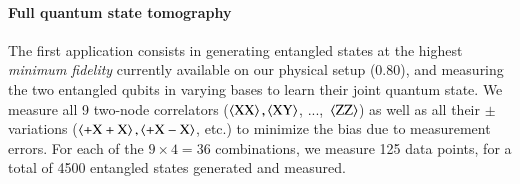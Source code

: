 
\paragraph{Full quantum state tomography}

The first application consists in generating entangled states at the highest \emph{minimum fidelity}
currently available on our physical setup (\num{0.80}), and measuring the two entangled qubits in
varying bases to learn their joint quantum state. We measure all \num{9} two-node correlators
($\braket{\mathrm{XX}}, \braket{\mathrm{XY}}$, ...,~$\braket{\mathrm{ZZ}}$) as well as all their
$\pm$ variations ($\braket{\mathrm{+X+X}}, \braket{\mathrm{+X-X}}$, etc.) to minimize the bias due
to measurement errors. For each of the $9 \times 4 = 36$ combinations, we measure \num{125} data
points, for a total of \num{4500} entangled states generated and measured.

